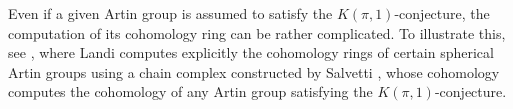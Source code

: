 \documentclass[10pt, oneside]{amsart}
\newcommand{\F}{\mathbb{F}}
\newcommand{\gr}{\operatorname{gr}} %
\theoremstyle{definition}
\theoremstyle{remark}
\theoremstyle{plain}
\begin{document}

Even if a given Artin group is assumed to satisfy the \(K(\pi,1)\)-conjecture, the computation of its cohomology ring can be rather complicated. To illustrate this, see \cite{Landi 2000}, where Landi computes explicitly the cohomology rings of certain spherical Artin groups using a chain complex constructed by Salvetti \cite{Salvetti 1994}, whose cohomology computes the cohomology of any Artin group satisfying the \(K(\pi,1)\)-conjecture.
\end{document}
